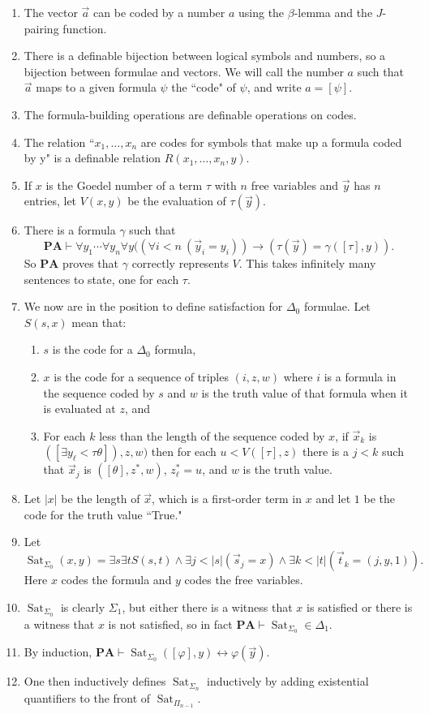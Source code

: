 \documentclass[12pt]{report}
\renewcommand{\iff}{\leftrightarrow}
\newcommand{\PA}{\mathbf{PA}}
\newcommand{\proves}{\vdash}
\DeclareMathOperator{\Sat}{Sat}
\theoremstyle{definition}
\begin{document}
\begin{enumerate}
\item The vector $\vec a$ can be coded by a number $a$ using the $\beta$-lemma and the $J$-pairing function.
\item There is a definable bijection between logical symbols and numbers, so a bijection between formulae and vectors. We will call the number $a$ such that $\vec a$ maps to a given formula $\psi$ the ``code" of $\psi$, and write $a = [\psi]$.
\item The formula-building operations are definable operations on codes.
\item The relation ``$x_1, \dots, x_n$ are codes for symbols that make up a formula coded by y" is a definable relation $R(x_1, \dots, x_n, y)$.
\item If $x$ is the Goedel number of a term $\tau$ with $n$ free variables and $\vec y$ has $n$ entries, let $V(x, y)$ be the evaluation of $\tau(\vec y)$.
\item There is a formula $\gamma$ such that
$$\PA \proves \forall y_1 \cdots \forall y_n \forall y ((\forall i < n~(\vec y_i = y_i)) \to (\tau(\vec y) = \gamma([\tau], y)).$$
So $\PA$ proves that $\gamma$ correctly represents $V$. This takes infinitely many sentences to state, one for each $\tau$.
\item We now are in the position to define satisfaction for $\Delta_0$ formulae. Let $S(s, x)$ mean that:
\begin{enumerate}
\item $s$ is the code for a $\Delta_0$ formula,
\item $x$ is the code for a sequence of triples $(i, z, w)$ where $i$ is a formula in the sequence coded by $s$ and $w$ is the truth value of that formula when it is evaluated at $z$, and
\item For each $k$ less than the length of the sequence coded by $x$, if $\vec x_k$ is $([\exists y_\ell<\tau\theta]), z, w)$ then for each $u < V([\tau], z)$ there is a $j < k$ such that $\vec x_j$ is $([\theta], z^*, w)$, $z^*_\ell = u$, and $w$ is the truth value.
\end{enumerate}
\item Let $|x|$ be the length of $\vec x$, which is a first-order term in $x$ and let $1$ be the code for the truth value ``True."
\item Let
$$\Sat_{\Sigma_0}(x, y) = \exists s \exists t S(s, t) \wedge \exists j < |s|(\vec s_j = x) \wedge \exists k < |t|(\vec t_k = (j, y, 1)).$$
Here $x$ codes the formula and $y$ codes the free variables.
\item $\Sat_{\Sigma_0}$ is clearly $\Sigma_1$, but either there is a witness that $x$ is satisfied or there is a witness that $x$ is not satisfied, so in fact $\PA \proves \Sat_{\Sigma_0} \in \Delta_1$.
\item By induction, $\PA \proves \Sat_{\Sigma_0}([\varphi], y) \iff \varphi(\vec y)$.
\item One then inductively defines $\Sat_{\Sigma_n}$ inductively by adding existential quantifiers to the front of $\Sat_{\Pi_{n-1}}$.
\end{enumerate}
\end{document}
